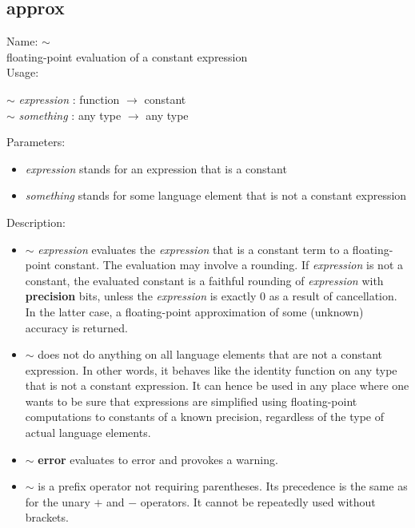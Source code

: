 \subsection{approx}
\label{labapprox}
\noindent Name: \textbf{$\sim$}\\
floating-point evaluation of a constant expression\\

\noindent Usage: 
\begin{center}
\textbf{$\sim$} \emph{expression} : \textsf{function} $\rightarrow$ \textsf{constant}\\
\textbf{$\sim$} \emph{something} : \textsf{any type} $\rightarrow$ \textsf{any type}\\
\end{center}
Parameters: 
\begin{itemize}
\item \emph{expression} stands for an expression that is a constant
\item \emph{something} stands for some language element that is not a constant expression
\end{itemize}
\noindent Description: \begin{itemize}

\item \textbf{$\sim$} \emph{expression} evaluates the \emph{expression} that is a constant
   term to a floating-point constant. The evaluation may involve a
   rounding. If \emph{expression} is not a constant, the evaluated constant is
   a faithful rounding of \emph{expression} with \textbf{precision} bits, unless the
   \emph{expression} is exactly $0$ as a result of cancellation. In the
   latter case, a floating-point approximation of some (unknown) accuracy
   is returned.

\item \textbf{$\sim$} does not do anything on all language elements that are not a
   constant expression.  In other words, it behaves like the identity
   function on any type that is not a constant expression. It can hence
   be used in any place where one wants to be sure that expressions are
   simplified using floating-point computations to constants of a known
   precision, regardless of the type of actual language elements.

\item \textbf{$\sim$} \textbf{error} evaluates to error and provokes a warning.

\item \textbf{$\sim$} is a prefix operator not requiring parentheses. Its
   precedence is the same as for the unary $+$ and $-$
   operators. It cannot be repeatedly used without brackets.
\end{itemize}
